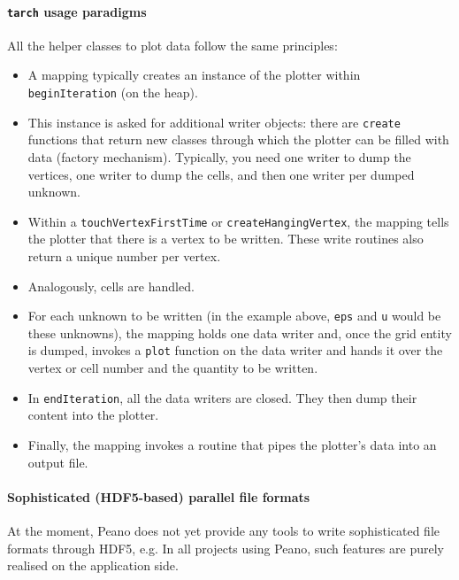 \paragraph{\texttt{tarch} usage paradigms}
All the helper classes to plot data follow the same principles:
\begin{itemize}
  \item A mapping typically creates an instance of the plotter within
  \texttt{beginIteration} (on the heap).
  \item This instance is asked for additional writer objects: there are
  \texttt{create} functions that return new classes through which the plotter
  can be filled with data (factory mechanism). Typically, you need one writer
  to dump the vertices, one writer to dump the cells, and then one writer per
  dumped unknown.
  \item Within a \texttt{touchVertexFirstTime} or \texttt{createHangingVertex},
  the mapping tells the plotter that there is a vertex to be written. These
  write routines also return a unique number per vertex.
  \item Analogously, cells are handled.
  \item For each unknown to be written (in the example above, \texttt{eps} and
  \texttt{u} would be these unknowns), the mapping holds one data writer and,
  once the grid entity is dumped, invokes a \texttt{plot} function on the data
  writer and hands it over the vertex or cell number and the quantity to be
  written.
  \item In \texttt{endIteration}, all the data writers are closed. They then
  dump their content into the plotter. 
  \item Finally, the mapping invokes a routine that pipes the plotter's data
  into an output file.
\end{itemize}


\paragraph{Sophisticated (HDF5-based) parallel file formats}
At the moment, Peano does not yet provide any tools to write sophisticated file
formats through HDF5, e.g.
In all projects using Peano, such features are purely realised on the
application side.

